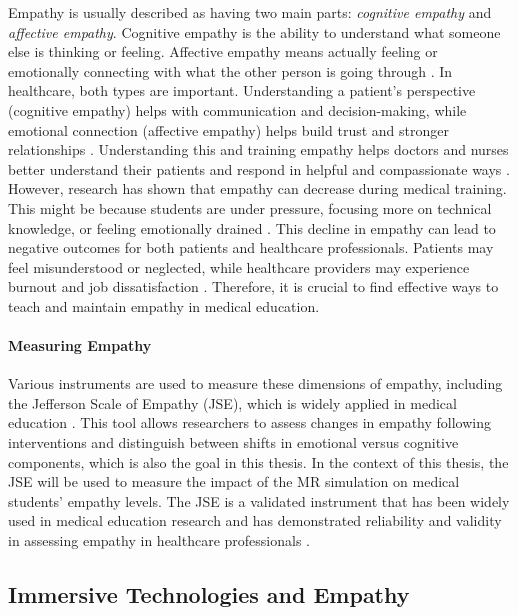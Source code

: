 Empathy is usually described as having two main parts: \textit{cognitive empathy} and \textit{affective empathy}. Cognitive empathy is the ability to understand what someone else is thinking or feeling. Affective empathy means actually feeling or emotionally connecting with what the other person is going through \cite{Ventura2020, Martingano2021}. In healthcare, both types are important. Understanding a patient's perspective (cognitive empathy) helps with communication and decision-making, while emotional connection (affective empathy) helps build trust and stronger relationships \cite{Cunico2012, Ozcan2018}.  Understanding this and training empathy helps doctors and nurses better understand their patients and respond in helpful and compassionate ways \cite{Ozcan2018, Olson1995}. However, research has shown that empathy can decrease during medical training. This might be because students are under pressure, focusing more on technical knowledge, or feeling emotionally drained \cite{Mattsson2024, Ozcan2018}. This decline in empathy can lead to negative outcomes for both patients and healthcare professionals. Patients may feel misunderstood or neglected, while healthcare providers may experience burnout and job dissatisfaction \cite{Mattsson2024, Cunico2012}. Therefore, it is crucial to find effective ways to teach and maintain empathy in medical education.

\paragraph{Measuring Empathy}
Various instruments are used to measure these dimensions of empathy, including the Jefferson Scale of Empathy (JSE), which is widely applied in medical education \cite{Alieldin2024}. This tool allows researchers to assess changes in empathy following interventions and distinguish between shifts in emotional versus cognitive components, which is also the goal in this thesis. In the context of this thesis, the JSE will be used to measure the impact of the MR simulation on medical students' empathy levels. The JSE is a validated instrument that has been widely used in medical education research and has demonstrated reliability and validity in assessing empathy in healthcare professionals \cite{Hojat2002}. 

\subsection{Immersive Technologies and Empathy}

